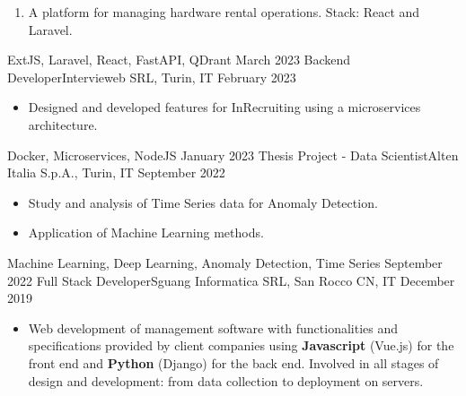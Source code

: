 \begin{experiences}
{\begin{itemize}
\begin{enumerate}
            \item A platform for managing hardware rental operations. Stack: React and Laravel.
            \end{enumerate}
		\end{itemize}
	}
	{ExtJS, Laravel, React, FastAPI, QDrant}
	\emptySeparator
	\emptySeparator
	\experience
	{March 2023}   {Backend Developer}{Intervieweb SRL, Turin, IT}
	{February 2023} {
		\begin{itemize}
			\item Designed and developed features for InRecruiting using a microservices architecture.
		\end{itemize}
	}
	{Docker, Microservices, NodeJS}
	\emptySeparator
	\emptySeparator
	\experience
	{January 2023}   {Thesis Project - Data Scientist}{Alten Italia S.p.A., Turin, IT}
	{September 2022} {
		\begin{itemize}
			\item Study and analysis of Time Series data for Anomaly Detection.
			\item Application of Machine Learning methods.
		\end{itemize}
	}
	{Machine Learning, Deep Learning, Anomaly Detection, Time Series}
	\emptySeparator
	\emptySeparator
	\experience
	{September 2022}   {Full Stack Developer}{Sguang Informatica SRL, San Rocco CN, IT}
	{December 2019} {
		\begin{itemize}
			\item Web development of management software with functionalities and specifications provided by client companies using \textbf{Javascript} (Vue.js) for the front end and \textbf{Python} (Django) for the back end. Involved in all stages of design and development: from data collection to deployment on servers. 
            

\end{itemize}}
\end{experiences}
